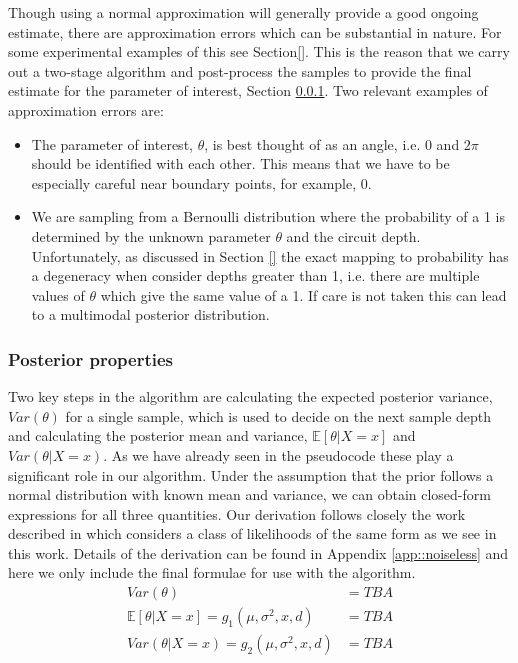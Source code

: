 Though using a normal approximation will generally provide a good ongoing estimate, there are approximation errors which can be substantial in nature. For some experimental examples of this see Section\ref{}. This is the reason that we carry out a two-stage algorithm and post-process the samples to provide the final estimate for the parameter of interest, Section \ref{sec::postprop}. Two relevant examples of approximation errors are:
\begin{itemize}
	\item The parameter of interest, $\theta$, is best thought of as an angle, i.e. $0$ and $2\pi$ should be identified with each other. This means that we have to be especially careful near boundary points, for example, 0.
	\item We are sampling from a Bernoulli distribution where the probability of a 1 is determined by the unknown parameter $\theta$ and the circuit depth. Unfortunately, as discussed in Section \ref{} the exact mapping to probability has a degeneracy when consider depths greater than 1, i.e. there are multiple values of $\theta$ which give the same value of a 1. If care is not taken this can lead to a multimodal posterior distribution.
\end{itemize}

\subsubsection{Posterior properties}\label{sec::postprop}
Two key steps in the algorithm are calculating the expected posterior variance, $Var(\theta)$ for a single sample, which is used to decide on the next sample depth and calculating the posterior mean and variance, $\mathbb{E}\left[\theta|X=x\right]$ and $Var(\theta|X=x)$. As we have already seen in the pseudocode these play a significant role in our algorithm. Under the assumption that the prior follows a normal distribution with known mean and variance, we can obtain closed-form expressions for all three quantities. Our derivation follows closely the work described in \cite{} which considers a class of likelihoods of the same form as we see in this work. Details of the derivation can be found in Appendix \ref{app::noiseless} and here we only include the final formulae for use with the algorithm.
\begin{align}
Var(\theta) &= TBA \label{eqn::postvac}\\
\mathbb{E} \left[ \theta|X=x\right]= g_1(\mu,\sigma^2,x,d) &= TBA \label{eqn::mean}\\
 Var(\theta|X=x)=g_2(\mu,\sigma^2,x,d) &= TBA \label{eqn::var}
\end{align}

